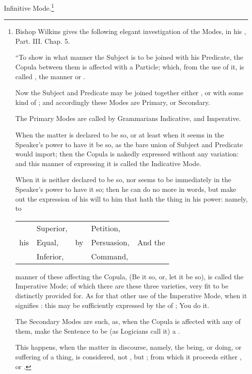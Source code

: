 Infinitive Mode.\footnote{Bishop Wilkins gives the following elegant
  investigation of the Modes, in his , Part. III.
  Chap. 5.

  ``To show in what manner the Subject is to be joined with his
  Predicate, the Copula between them is affected with a Particle; which,
  from the use of it, is called , the manner or .

  Now the Subject and Predicate may be joined together either
  , or with some kind of ; and accordingly
  these Modes are Primary, or Secondary.

  The Primary Modes are called by Grammarians Indicative, and
  Imperative.

  When the matter is declared to be so, or at least when it seems in the
  Speaker's power to have it be so, as the bare union of Subject and
  Predicate would import; then the Copula is nakedly expressed without
  any variation: and this manner of expressing it is called the
  Indicative Mode.

  When it is neither declared to be so, nor seems to be immediately in
  the Speaker's power to have it so; then he can do no more in words,
  but make out the expression of his will to him that hath the thing in
  his power: namely, to

  \begin{tabular}[h]{lllll}
    & Superior, & & Petition,\\
    his & Equal, & by & Persuasion, & And the\\
    & Inferior, & & Command,\\
  \end{tabular}

  manner of these affecting the Copula, (Be it so, or, let it be so), is
  called the Imperative Mode; of which there are these three varieties,
  very fit to be distinctly provided for. As for that other use of the
  Imperative Mode, when it signifies : this may be
  sufficiently expressed by the  of ; You
   do it.

  The Secondary Modes are such, as, when the Copula is affected with any
  of them, make the Sentence to be (as Logicians call it) a .

  This happens, when the matter in discourse, namely, the being, or
  doing, or suffering of a thing, is considered, not , but ; from which it proceeds
  either , or .

}
